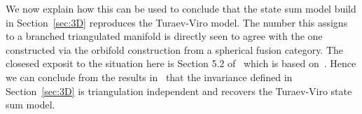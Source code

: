 We now explain how this can be used to conclude that the state sum model build in Section~\ref{sec:3D} reproduces the Turaev-Viro model.
The number this assigns to a branched triangulated manifold is directly seen to agree with the one constructed via the orbifold construction from a spherical fusion category. The closesed exposit to the situation here is Section 5.2 of~\cite{3DOrb} which is based on~\cite{Carqueville:2018sld}. Hence we can conclude from the results in~\cite{Carqueville:2018sld} that the invariance defined in Section~\ref{sec:3D} is triangulation independent and recovers the Turaev-Viro state sum model.

